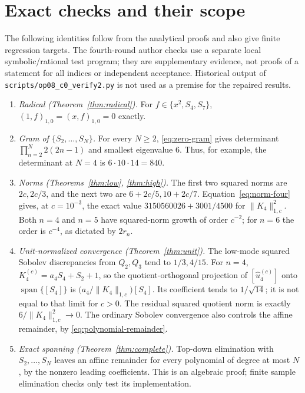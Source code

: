 ﻿\documentclass[11pt]{article}
\begin{document}
\section{Exact checks and their scope}\label{sec:audit}

The following identities follow from the analytical proofs and also give
finite regression targets.  The fourth-round author checks use a separate
local symbolic/rational test program; they are supplementary evidence,
not proofs of a statement for all indices or independent acceptance.
Historical output of \texttt{scripts/op08\_c0\_verify2.py} is not used as a
premise for the repaired results.

\begin{enumerate}[leftmargin=1.6em]
	\item \emph{Radical (Theorem~\ref{thm:radical}).}  For $f\in\{x^2,S_4,S_7\}$,
	$(1,f)_{1,0}=(x,f)_{1,0}=0$ exactly.
	\item \emph{Gram of $\{S_2,\ldots,S_N\}$.}  For every $N\ge2$,
	\eqref{eq:zero-gram} gives determinant
	$\prod_{n=2}^N2(2n-1)$ and smallest eigenvalue $6$.  Thus, for
	example, the determinant at $N=4$ is $6\cdot10\cdot14=840$.
	\item \emph{Norms (Theorems~\ref{thm:low}, \ref{thm:high}).}
	The first two squared norms are $2c,2c/3$, and the next two are
	$6+2c/5,10+2c/7$.  Equation~\eqref{eq:norm-four} gives, at
	$c=10^{-3}$, the exact value
	$3150560026+3001/4500$ for $\|K_4\|_{1,c}^2$.
	Both $n=4$ and $n=5$ have squared-norm growth of order $c^{-2}$;
	for $n=6$ the order is $c^{-4}$, as dictated by $2r_n$.
	\item \emph{Unit-normalized convergence (Theorem~\ref{thm:unit}).}
	The low-mode squared Sobolev discrepancies from $Q_2,Q_3$ tend to
	$1/3,4/15$.  For $n=4$, $K_4^{(c)}=a_4S_4+S_2+1$, so the
	quotient-orthogonal projection of $[\widehat u_4^{(c)}]$ onto
	$\operatorname{span}\{[S_4]\}$ is
	$\bigl(a_4/\|K_4\|_{1,c}\bigr)[S_4]$.  Its coefficient tends to
	$1/\sqrt{14}$; it is not equal to that limit for $c>0$.
	The residual squared quotient norm is exactly
	$6/\|K_4\|_{1,c}^2\to0$.  The ordinary Sobolev convergence also
	controls the affine remainder, by \eqref{eq:polynomial-remainder}.
	\item \emph{Exact spanning (Theorem~\ref{thm:complete}).}
	Top-down elimination with $S_2,\ldots,S_N$ leaves an affine
	remainder for every polynomial of degree at most $N$, by the
	nonzero leading coefficients.  This is an algebraic proof;
	finite sample elimination checks only test its implementation.
\end{enumerate}
\end{document}
